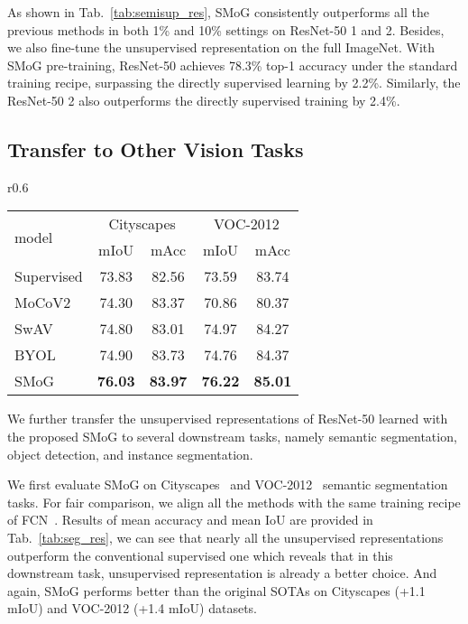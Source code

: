 \documentclass[runningheads]{style/llncs}
\begin{document}
As shown in Tab.~\ref{tab:semisup_res}, SMoG consistently outperforms all the previous methods in both 1\% and 10\% settings on ResNet-50 1 and 2. Besides, we also fine-tune the unsupervised representation on the full ImageNet. With SMoG pre-training, ResNet-50 achieves 78.3\% top-1 accuracy under the standard training recipe, surpassing the directly supervised learning by 2.2\%. Similarly, the ResNet-50  2 also outperforms the directly supervised training by 2.4\%.

\subsection{Transfer to Other Vision Tasks}
\begin{wraptable}[12]{r}{0.6\linewidth}
	\vspace{-0.35in}
	\caption{Transfer learning results on semantic segmentation task. We fine-tune the representations on VOC2012 and Cityscapes dataset. The segmentation model is FCN with ResNet-50.}
	\small
\centering
	\setlength\arrayrulewidth{0.8pt}
\begin{tabular}{l|cc|cc}
		\multirow{2}{*}{model} & \multicolumn{2}{c|}{Cityscapes}&\multicolumn{2}{c}{VOC-2012}\\
		& mIoU & mAcc & mIoU & mAcc \\
		\hline
		Supervised & 73.83 & 82.56 & 73.59 & 83.74 \\
		MoCoV2 & 74.30 & 83.37 & 70.86 & 80.37 \\
		SwAV & 74.80 & 83.01 & 74.97 & 84.27\\
		BYOL & 74.90 & 83.73 & 74.76 & 84.37\\
		\rowcolor[gray]{0.95} SMoG & \textbf{76.03} & \textbf{83.97} & \textbf{76.22} & \textbf{85.01}\\
		
	\end{tabular}\label{tab:seg_res}
\end{wraptable}
We further transfer the unsupervised representations of ResNet-50 learned with the proposed SMoG to several downstream tasks, namely semantic segmentation, object detection, and instance segmentation.

We first evaluate SMoG on Cityscapes~\cite{cityscapes} and VOC-2012~\cite{voc} semantic segmentation tasks. For fair comparison, we align all the methods with the same training recipe of FCN~\cite{fcn}. Results of mean accuracy and mean IoU are provided in Tab.~\ref{tab:seg_res}, we can see that nearly all the unsupervised representations outperform the conventional supervised one which reveals that in this downstream task, unsupervised representation is already a better choice. And again, SMoG performs better than the original SOTAs on Cityscapes (+1.1 mIoU) and VOC-2012 (+1.4 mIoU) datasets.
\end{document}
